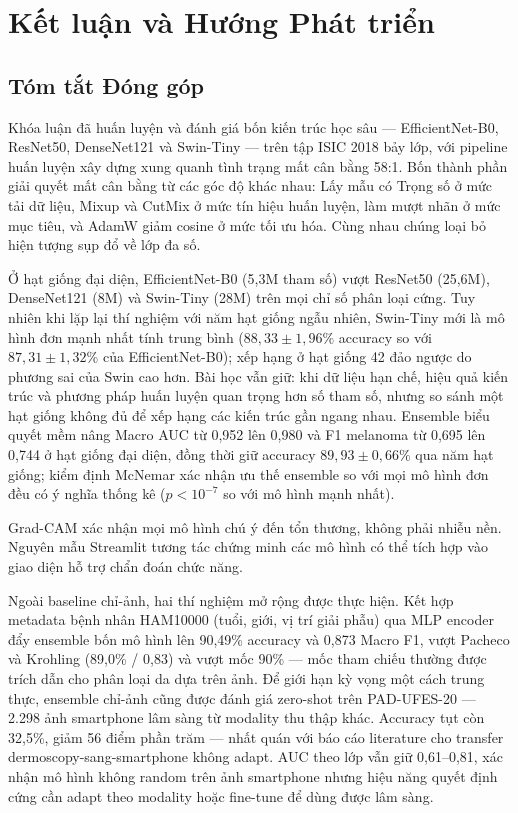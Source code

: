 \chapter{Kết luận và Hướng Phát triển}

\section{Tóm tắt Đóng góp}

Khóa luận đã huấn luyện và đánh giá bốn kiến trúc học sâu --- EfficientNet-B0, ResNet50, DenseNet121 và Swin-Tiny --- trên tập ISIC 2018 bảy lớp, với pipeline huấn luyện xây dựng xung quanh tình trạng mất cân bằng 58:1. Bốn thành phần giải quyết mất cân bằng từ các góc độ khác nhau: Lấy mẫu có Trọng số ở mức tải dữ liệu, Mixup và CutMix ở mức tín hiệu huấn luyện, làm mượt nhãn ở mức mục tiêu, và AdamW giảm cosine ở mức tối ưu hóa. Cùng nhau chúng loại bỏ hiện tượng sụp đổ về lớp đa số.

Ở hạt giống đại diện, EfficientNet-B0 (5,3M tham số) vượt ResNet50 (25,6M), DenseNet121 (8M) và Swin-Tiny (28M) trên mọi chỉ số phân loại cứng. Tuy nhiên khi lặp lại thí nghiệm với năm hạt giống ngẫu nhiên, Swin-Tiny mới là mô hình đơn mạnh nhất tính trung bình ($88{,}33 \pm 1{,}96\%$ accuracy so với $87{,}31 \pm 1{,}32\%$ của EfficientNet-B0); xếp hạng ở hạt giống 42 đảo ngược do phương sai của Swin cao hơn. Bài học vẫn giữ: khi dữ liệu hạn chế, hiệu quả kiến trúc và phương pháp huấn luyện quan trọng hơn số tham số, nhưng so sánh một hạt giống không đủ để xếp hạng các kiến trúc gần ngang nhau. Ensemble biểu quyết mềm nâng Macro AUC từ 0,952 lên 0,980 và F1 melanoma từ 0,695 lên 0,744 ở hạt giống đại diện, đồng thời giữ accuracy $89{,}93 \pm 0{,}66\%$ qua năm hạt giống; kiểm định McNemar xác nhận ưu thế ensemble so với mọi mô hình đơn đều có ý nghĩa thống kê ($p < 10^{-7}$ so với mô hình mạnh nhất).

Grad-CAM xác nhận mọi mô hình chú ý đến tổn thương, không phải nhiễu nền. Nguyên mẫu Streamlit tương tác chứng minh các mô hình có thể tích hợp vào giao diện hỗ trợ chẩn đoán chức năng.

Ngoài baseline chỉ-ảnh, hai thí nghiệm mở rộng được thực hiện. Kết hợp metadata bệnh nhân HAM10000 (tuổi, giới, vị trí giải phẫu) qua MLP encoder đẩy ensemble bốn mô hình lên 90,49\% accuracy và 0,873 Macro F1, vượt Pacheco và Krohling (89,0\% / 0,83) và vượt mốc 90\% --- mốc tham chiếu thường được trích dẫn cho phân loại da dựa trên ảnh. Để giới hạn kỳ vọng một cách trung thực, ensemble chỉ-ảnh cũng được đánh giá zero-shot trên PAD-UFES-20 --- 2.298 ảnh smartphone lâm sàng từ modality thu thập khác. Accuracy tụt còn 32,5\%, giảm 56 điểm phần trăm --- nhất quán với báo cáo literature cho transfer dermoscopy-sang-smartphone không adapt. AUC theo lớp vẫn giữ 0,61--0,81, xác nhận mô hình không random trên ảnh smartphone nhưng hiệu năng quyết định cứng cần adapt theo modality hoặc fine-tune để dùng được lâm sàng.

